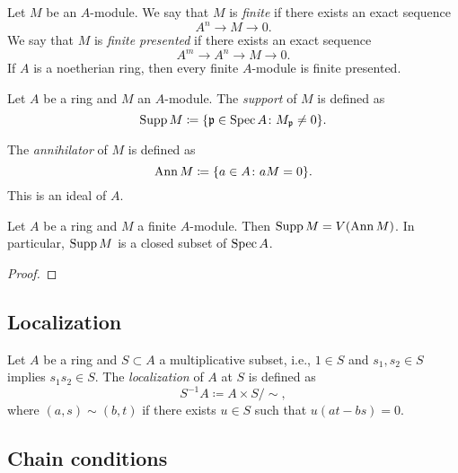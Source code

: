     Let \(M\) be an \(A\)-module.
    We say that \(M\) is \emph{finite} if there exists an exact sequence
    \[ A^n \to M \to 0. \]
    We say that \(M\) is \emph{finite presented} if there exists an exact sequence
    \[ A^m \to A^n \to M \to 0. \]
    If \(A\) is a noetherian ring, then every finite \(A\)-module is finite presented.

    \begin{definition}\label{def: support of a module}
        Let \(A\) be a ring and \(M\) an \(A\)-module.
        The \emph{support} of \(M\) is defined as
        \[
            \operatorname{Supp} M \coloneqq \{ {\mathfrak{p}} \in \operatorname{Spec} A \colon M_{\mathfrak{p}} \neq 0\}.
        \]
    \end{definition}

    The \emph{annihilator} of \(M\) is defined as
    \[ \operatorname{Ann} M \coloneqq \{ a \in A \colon aM = 0\}. \]
    This is an ideal of \(A\).

    \begin{proposition}\label{prop: support of a finite module}
        Let \(A\) be a ring and \(M\) a finite \(A\)-module.
        Then \(\operatorname{Supp} M = V(\operatorname{Ann} M)\).
        In particular, \(\operatorname{Supp} M\) is a closed subset of \(\operatorname{Spec} A\).
    \end{proposition}
    \begin{proof}
    \end{proof}

\subsection{Localization}

    \begin{definition}\label{def: localization}
        Let \(A\) be a ring and \(S \subset A\) a multiplicative subset, i.e., \(1 \in S\) and \(s_1,s_2 \in S\) implies \(s_1 s_2 \in S\).
        The \emph{localization} of \(A\) at \(S\) is defined as
        \[ S^{-1}A \coloneqq A \times S / \sim, \]
        where \((a,s) \sim (b,t)\) if there exists \(u \in S\) such that \(u(at - bs) = 0\).
    \end{definition}

    \begin{proposition}\label{prop: when is localization injective}
        
    \end{proposition}

\subsection{Chain conditions}



